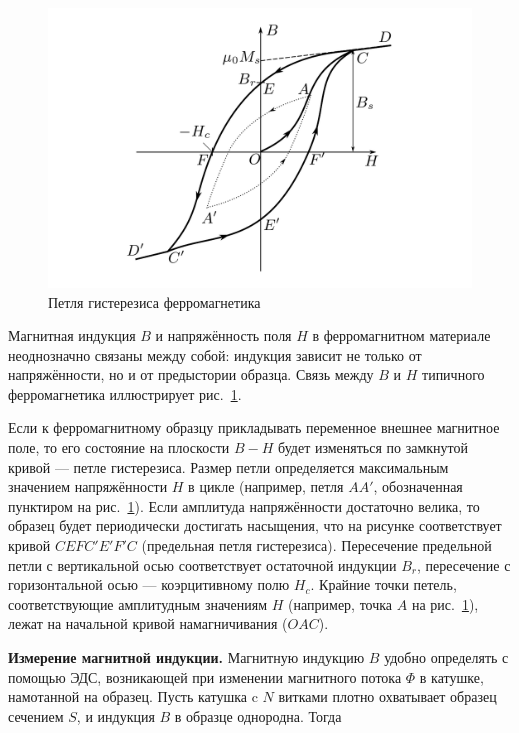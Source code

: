 \documentclass[a4paper, 12pt]{article}
\begin{document}
\begin{figure}[H]
\begin{center}
    \includegraphics[scale=2]{1.png}
\end{center}
\caption{Петля гистерезиса ферромагнетика}
\label{fig:petlya}
\end{figure}

Магнитная индукция $ B $ и напряжённость поля $ H $ в ферромагнитном материале неоднозначно связаны между собой: индукция зависит
не только от напряжённости, но и от предыстории образца. Связь между $ B $ и $ H $ типичного ферромагнетика иллюстрирует рис.~\ref{fig:petlya}.

Если к ферромагнитному образцу прикладывать переменное внешнее
магнитное поле, то его состояние на плоскости $ B-H $ будет изменяться
по замкнутой кривой — петле гистерезиса. Размер петли определяется
максимальным значением напряжённости $ H $ в цикле (например, петля $ AA' $,
обозначенная пунктиром на рис.~\ref{fig:petlya}). Если амплитуда напряжённости достаточно велика, то образец будет периодически достигать насыщения,
что на рисунке соответствует кривой $ CEFC'E'F'C $ (предельная петля
гистерезиса). Пересечение предельной петли с вертикальной осью соответствует остаточной индукции $B_r$, пересечение с горизонтальной осью
— коэрцитивному полю $H_c$. Крайние точки петель, соответствующие амплитудным значениям $ H $ (например, точка $ A $ на рис.~\ref{fig:petlya}), лежат на начальной кривой намагничивания ($ OAC $).

\textbf{Измерение магнитной индукции.} Магнитную индукцию $ B $ удобно
определять с помощью ЭДС, возникающей при изменении магнитного
потока $ \Phi $ в катушке, намотанной на образец. Пусть катушка c $ N $ витками плотно охватывает образец сечением $ S $, и индукция $ B $ в образце
однородна. Тогда
\end{document}
